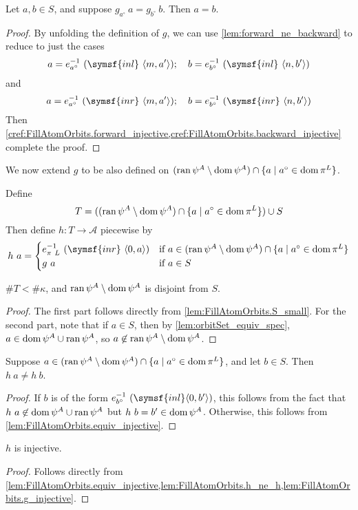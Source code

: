 \begin{lemma}
    \label{lem:FillAtomOrbits.g_injective}
    Let \( a, b \in S \), and suppose \( g_{a^\circ}\ a = g_{b^\circ}\ b \).
    Then \( a = b \).
\end{lemma}
\begin{proof}
    By unfolding the definition of \( g \), we can use \cref{lem:forward_ne_backward} to reduce to just the cases
    \[ a = e_{a^\circ}^{-1}\ (\symsf{inl}\ \langle m, a' \rangle);\quad b = e_{b^\circ}^{-1}\ (\symsf{inl}\ \langle n, b' \rangle) \]
    and
    \[ a = e_{a^\circ}^{-1}\ (\symsf{inr}\ \langle m, a' \rangle);\quad b = e_{b^\circ}^{-1}\ (\symsf{inr}\ \langle n, b' \rangle) \]
    Then \cref{cref:FillAtomOrbits.forward_injective,cref:FillAtomOrbits.backward_injective} complete the proof.
\end{proof}
We now extend \( g \) to be also defined on \( (\operatorname{ran} \psi^A \setminus \operatorname{dom} \psi^A) \cap \{ a \mid a^\circ \in \operatorname{dom} \pi^L \} \).
\begin{definition}
    Define
    \[ T = ((\operatorname{ran} \psi^A \setminus \operatorname{dom} \psi^A) \cap \{ a \mid a^\circ \in \operatorname{dom} \pi^L \}) \cup S \]
    Then define \( h : T \to \mathcal A \) piecewise by
    \[ h\ a = \begin{cases}
        e_{\pi\ L}^{-1}\ (\symsf{inr}\ \langle 0, a \rangle) & \text{if } a \in (\ran \psi^A \setminus \dom \psi^A) \cap \{ a \mid a^\circ \in \dom \pi^L \} \\
        g\ a & \text{if } a \in S
    \end{cases} \]
\end{definition}
\begin{lemma}
    \( \#T < \#\kappa \), and \( \operatorname{ran} \psi^A \setminus \operatorname{dom} \psi^A \) is disjoint from \( S \).
\end{lemma}
\begin{proof}
    The first part follows directly from \cref{lem:FillAtomOrbits.S_small}.
    For the second part, note that if \( a \in S \), then by \cref{lem:orbitSet_equiv_spec}, \( a \in \operatorname{dom} \psi^A \cup \operatorname{ran} \psi^A \), so \( a \not\in \operatorname{ran} \psi^A \setminus \operatorname{dom} \psi^A \).
\end{proof}
\begin{lemma}
    \label{lem:FillAtomOrbits.h_ne_h}
    Suppose \( a \in (\operatorname{ran} \psi^A \setminus \operatorname{dom} \psi^A) \cap \{ a \mid a^\circ \in \operatorname{dom} \pi^L \} \), and let \( b \in S \).
    Then \( h\ a \neq h\ b \).
\end{lemma}
\begin{proof}
    If \( b \) is of the form \( e_{b^\circ}^{-1}\ (\symsf{inl} \langle 0, b' \rangle) \), this follows from the fact that \( h\ a \not\in \operatorname{dom} \psi^A \cup \operatorname{ran} \psi^A \) but \( h\ b = b' \in \operatorname{dom} \psi^A \).
    Otherwise, this follows from \cref{lem:FillAtomOrbits.equiv_injective}.
\end{proof}
\begin{lemma}
    \( h \) is injective.
\end{lemma}
\begin{proof}
    Follows directly from \cref{lem:FillAtomOrbits.equiv_injective,lem:FillAtomOrbits.h_ne_h,lem:FillAtomOrbits.g_injective}.
\end{proof}
